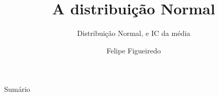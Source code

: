 \documentclass{beamer}
\title%
{A distribuição Normal}
\subtitle
{Distribuição Normal, e IC da média} %
\author%
{Felipe Figueiredo}%
\institute[] %
{
}
\date%
{}
\begin{document}
\begin{frame}
  \titlepage
\end{frame}

\begin{frame}{Sumário}
  \tableofcontents
\end{frame}








\end{document}
